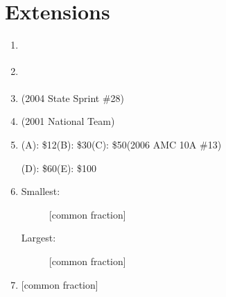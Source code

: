 \documentclass{article}
\begin{document}


\newpage

\section*{Extensions}
\vspace{1cm}
\begin{enumerate}
\item \underline{\hspace{3in}}\vspace{1cm}
\item \underline{\hspace{3in}}\vspace{1cm}
\item \underline{\hspace{3in}} (2004 State Sprint \#28)\vspace{1cm}
\item \underline{\hspace{3in}} (2001 National Team)\vspace{1cm}
\item (A): \$12\quad (B): \$30\quad (C): \$50\hspace{1.3in}(2006 AMC 10A \#13)\par
(D): \$60\quad (E): \$100 \vspace{1cm}
\item \begin{description}
\item[Smallest:] \underline{\hspace{2.4in}} [common fraction]\vspace{1cm}
\item[Largest:] \underline{\hspace{2.4in}} [common fraction]\vspace{1cm}
\end{description}
\item \underline{\hspace{3in}} [common fraction]
\end{enumerate}
\end{document}
